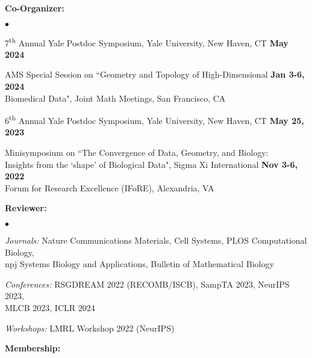 \documentclass[margin,line]{res}
\newenvironment{list1}{
  \begin{list}{\ding{113}}{
      \setlength{\itemsep}{0in}
      \setlength{\parsep}{0in} \setlength{\parskip}{0in}
      \setlength{\topsep}{0in} \setlength{\partopsep}{0in}
      \setlength{\leftmargin}{0.17in}}}{\end{list}}
\newenvironment{list2}{
  \begin{list}{$\bullet$}{
      \setlength{\itemsep}{0in}
      \setlength{\parsep}{0in} \setlength{\parskip}{0in}
      \setlength{\topsep}{0in} \setlength{\partopsep}{0in}
      \setlength{\leftmargin}{0.2in}}}{\end{list}}
\begin{document}
\begin{resume}
\begin{list1}
\setlength\itemsep{0.5em}
\item[] {\bf Co-Organizer:}
\vspace*{.2cm}
  \begin{list2}
  \setlength\itemsep{0.75em}
  \item[] 7\textsuperscript{th} Annual Yale Postdoc Symposium, Yale University, New Haven, CT \hfill {\bf \small May 2024}
  \item[] AMS Special Session on ``Geometry and Topology of High-Dimensional \hfill {\bf \small Jan 3-6, 2024} \\
          Biomedical Data", Joint Math Meetings, San Francisco, CA 
  \item[] 6\textsuperscript{th} Annual Yale Postdoc Symposium, Yale University, New Haven, CT \hfill {\bf \small May 25, 2023}
  \item[] Minisymposium on ``The Convergence of Data, Geometry, and Biology:  \\
          Insights from the `shape' of Biological Data", Sigma Xi International \hfill {\bf \small Nov 3-6, 2022} \\
          Forum for Research Excellence (IFoRE), Alexandria, VA 
  \end{list2}
\vspace*{.2cm}
\item[] {\bf Reviewer:}
\vspace*{.2cm}
  \begin{list2}
  \setlength\itemsep{0.5em}
  \item[] \textit{Journals:} \hspace*{1.42em} Nature Communications Materials, Cell Systems, PLOS Computational Biology, \\ 
  \hspace*{5.9em} npj Systems Biology and Applications, Bulletin of Mathematical Biology
  \item[] \textit{Conferences:} \hspace*{0.1em} RSGDREAM 2022 (RECOMB/ISCB), SampTA 2023, NeurIPS 2023, \\
  \hspace*{6.2em} MLCB 2023, ICLR 2024
  \item[] \textit{Workshops:} \hspace*{0.6em} LMRL Workshop 2022 (NeurIPS)
  \end{list2}
\vspace*{.2cm}
\item[] {\bf Membership:}
\vspace*{.2cm}

\end{list1}
\end{resume}
\end{document}
